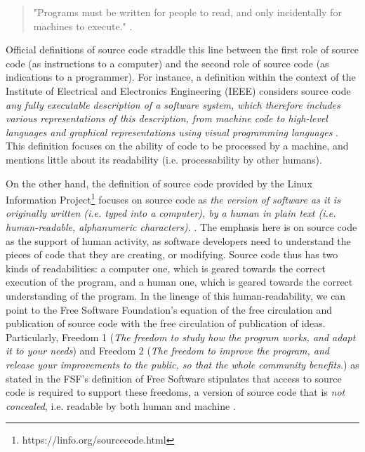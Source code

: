 \begin{quote}
    "Programs must be written for people to read, and only incidentally for machines to execute." \citep{abelson_structure_1979}.
\end{quote}


Official definitions of source code straddle this line between the first role of source code (as instructions to a computer) and the second role of source code (as indications to a programmer). For instance, a definition within the context of the Institute of Electrical and Electronics Engineering (IEEE) considers source code \emph{any fully executable description of a software system, which therefore includes various representations of this description, from machine code to high-level languages and graphical representations using visual programming languages} \citep{harman_why_2010}. This definition focuses on the ability of code to be processed by a machine, and mentions little about its readability (i.e. processability by other humans).

On the other hand, the definition of source code provided by the Linux Information Project\footnote{https://linfo.org/sourcecode.html} focuses on source code as \emph{the version of software as it is originally written (i.e. typed into a computer), by a human in plain text (i.e. human-readable, alphanumeric characters).} \citep{linuxinformationproject_source_2004}. The emphasis here is on source code as the support of human activity, as software developers need to understand the pieces of code that they are creating, or modifying. Source code thus has two kinds of readabilities: a computer one, which is geared towards the correct execution of the program, and a human one, which is geared towards the correct understanding of the program. In the lineage of this human-readability, we can point to the Free Software Foundation's equation of the free circulation and publication of source code with the free circulation of publication of ideas. Particularly, Freedom 1 (\emph{The freedom to study how the program works, and adapt it to your needs}) and Freedom 2 (\emph{The freedom to improve the program, and release your improvements to the public, so that the whole community benefits.}) as stated in the FSF's definition of Free Software stipulates that access to source code is required to support these freedoms, a version of source code that is \emph{not concealed}, i.e. readable by both human and machine \citep{stallman_free_2002}.


